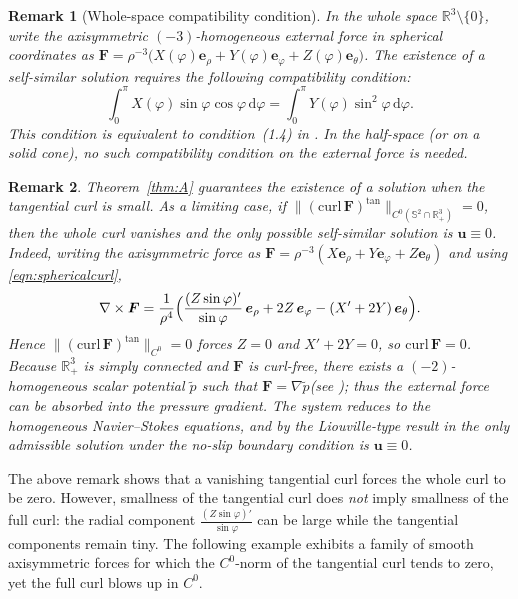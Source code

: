 \documentclass{amsart}
\newtheorem{remark}{Remark}[section]
\newcommand{\curl}{\mathrm{curl}}
\newcommand{\Bu}{{\boldsymbol{u}}}
\newcommand{\Be}{{\boldsymbol{e}}}
\newcommand{\BF}{{\boldsymbol{F}}}
\begin{document}
\begin{remark}[Whole-space compatibility condition]
In the whole space $\mathbb{R}^3\setminus\{0\}$, write the axisymmetric $(-3)$-homogeneous external force in spherical coordinates as
$\BF = \rho^{-3}\bigl(X(\varphi)\Be_{\rho} + Y(\varphi)\Be_{\varphi} + Z(\varphi)\Be_{\theta}\bigr)$.
The existence of a self-similar solution 
requires the following compatibility condition:
\[
\int_0^\pi X(\varphi)\sin\varphi\cos\varphi\,\mathrm{d}\varphi
= \int_0^\pi Y(\varphi)\sin^{2}\!\varphi\,\mathrm{d}\varphi .
\]
This condition is equivalent to condition~(1.4) in \cite{Shi18}.
In the half-space (or on a solid cone), no such 
compatibility condition on the external force is needed.
\end{remark}



\begin{remark}
Theorem~\ref{thm:A} guarantees the existence of a solution when the tangential curl is small.
As a limiting case, if $\|(\curl\,\BF)^{\tan}\|_{C^0(\mathbb{S}^2\cap\mathbb{R}^3_+)}=0$, then the whole curl vanishes and the only possible self-similar solution is $\Bu\equiv0$.
Indeed, writing the axisymmetric force as $\BF=\rho^{-3}(X\Be_\rho+Y\Be_\varphi+Z\Be_\theta)$ and using \eqref{eqn:sphericalcurl},
\[
\nabla\times\BF = \frac{1}{\rho^4}\Bigl( \frac{(Z\sin\varphi)'}{\sin\varphi}\,\Be_\rho + 2Z\,\Be_\varphi - (X'+2Y)\,\Be_\theta \Bigr).
\]
Hence $\|(\curl\,\BF)^{\tan}\|_{C^0}=0$ forces $Z=0$ and $X'+2Y=0$, so $\curl\,\BF=0$.
Because $\mathbb R^3_+$ is simply connected and $\BF$ is curl-free,
there exists a $(-2)$-homogeneous scalar potential $\widetilde p$
such that $\BF=\nabla\widetilde p$(see \cite[p.~10]{Tsai18}); thus the external force can be absorbed into the pressure gradient.
The system reduces to the homogeneous Navier--Stokes equations, and by the Liouville-type result in \cite[Theorem~5.1]{KMT18} the only admissible solution under the no-slip boundary condition is $\Bu\equiv0$.
\end{remark}



The above remark shows that a vanishing tangential curl forces the whole curl to be zero.  
However, smallness of the tangential curl does \emph{not} imply smallness of the full curl: the radial component
$\frac{(Z\sin\varphi)'}{\sin\varphi}$ can be large while the tangential components remain tiny.  
The following example exhibits a family of smooth axisymmetric forces for which the $C^{0}$-norm of the tangential curl tends to zero, yet the full curl blows up in $C^{0}$.
\end{document}
